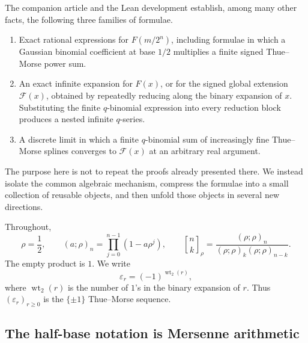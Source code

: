 \documentclass[11pt,oneside]{article}
\theoremstyle{definition}
\theoremstyle{remark}
\newcommand{\eps}{\varepsilon}
\newcommand{\wt}{\operatorname{wt}_2}
\newcommand{\poch}[3]{\left(#1;#2\right)_{#3}}
\newcommand{\qbinom}[3]{\genfrac{[}{]}{0pt}{}{#1}{#2}_{#3}}
\newcommand{\Fglobal}{\mathcal F}
\begin{document}
The companion article and the Lean development establish, among many other
facts, the following three families of formulae.

\begin{enumerate}
\item Exact rational expressions for $F(m/2^n)$, including formulae in which a
  Gaussian binomial coefficient at base $1/2$ multiplies a finite signed
  Thue--Morse power sum.
\item An exact infinite expansion for $F(x)$, or for the signed
  global extension $\Fglobal(x)$, obtained by repeatedly reducing along the
  binary expansion of $x$.  Substituting the finite $q$-binomial expression
  into every reduction block produces a nested infinite $q$-series.
\item A discrete limit in which a finite $q$-binomial sum of increasingly fine
  Thue--Morse splines converges to $\Fglobal(x)$ at an arbitrary real argument.
\end{enumerate}

The purpose here is not to repeat the proofs already presented there.  We
instead isolate the common algebraic mechanism, compress the formulae into a
small collection of reusable objects, and then unfold those objects in several
new directions.

Throughout,
\[
  \rho=\frac12,
  \qquad
  \poch{a}{\rho}{n}=\prod_{j=0}^{n-1}(1-a\rho^j),
  \qquad
  \qbinom{n}{k}{\rho}
  =\frac{\poch{\rho}{\rho}{n}}
  {\poch{\rho}{\rho}{k}\poch{\rho}{\rho}{n-k}}.
\]
The empty product is $1$.  We write
\[
  \eps_r=(-1)^{\wt(r)},
\]
where $\wt(r)$ is the number of $1$'s in the binary expansion of $r$.
Thus $(\eps_r)_{r\ge0}$ is the $\{\pm1\}$ Thue--Morse sequence.


\subsection{The half-base notation is Mersenne arithmetic}
\end{document}
